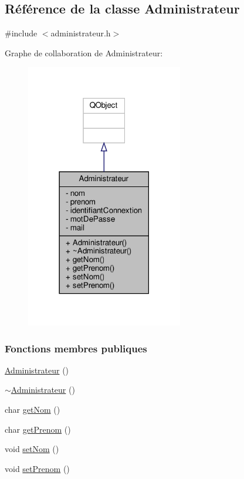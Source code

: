 \hypertarget{class_administrateur}{}\subsection{Référence de la classe Administrateur}
\label{class_administrateur}


{\ttfamily \#include $<$administrateur.\+h$>$}



Graphe de collaboration de Administrateur\+:\nopagebreak
\begin{figure}[H]
\begin{center}
\leavevmode
\includegraphics[width=194pt]{class_administrateur__coll__graph}
\end{center}
\end{figure}
\subsubsection*{Fonctions membres publiques}
\begin{DoxyCompactItemize}
\item 
\hyperlink{class_administrateur_a6c8a0ea7ae7d606f0c7ae9f6487759d9}{Administrateur} ()
\item 
\hyperlink{class_administrateur_af11ee7b63aabe45c5c2aa0532db1c7db}{$\sim$\+Administrateur} ()
\item 
char \hyperlink{class_administrateur_a52d72cdd1bb1be507894c301ad56bc41}{get\+Nom} ()
\item 
char \hyperlink{class_administrateur_a05a90b3a0185837ac81da4b8411f82bb}{get\+Prenom} ()
\item 
void \hyperlink{class_administrateur_a7af923f28608df559c8d1768e5be036a}{set\+Nom} ()
\item 
void \hyperlink{class_administrateur_a9dd74a2ca87a1ab7618ebfbe50562731}{set\+Prenom} ()
\end{DoxyCompactItemize}
